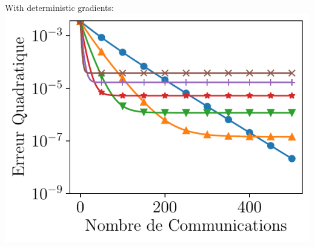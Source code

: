 \documentclass[aspectratio=169,12pt]{beamer}
\newcommand{\cmark}{\ding{51}}%
\newcommand{\xmark}{\ding{55}}%
\begin{document}
\begin{frame}[t]
\begin{minipage}{0.5\linewidth}
  \end{minipage}~%
  \begin{minipage}{0.48\linewidth}
    \begin{center}
      \small
    With deterministic gradients:
    \includegraphics[width=0.75\linewidth]{images/local_training_heterogeneous.pdf}%
  \end{center}
  


    
    

  \end{minipage}

  \vspace{1.5em}


\end{frame}
\end{document}
